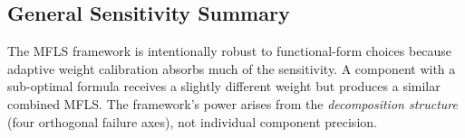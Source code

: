 \documentclass[journal]{IEEEtran}
\begin{document}
\subsection{General Sensitivity Summary}

The MFLS framework is intentionally robust to functional-form choices because adaptive weight calibration absorbs much of the sensitivity. A component with a sub-optimal formula receives a slightly different weight but produces a similar combined MFLS. The framework's power arises from the \textit{decomposition structure} (four orthogonal failure axes), not individual component precision.
\end{document}
